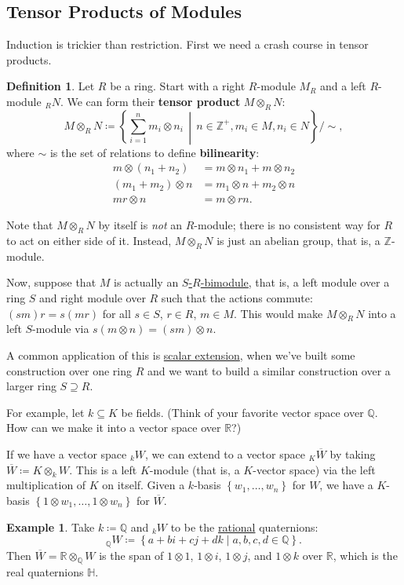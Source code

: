 \documentclass[12pt]{article}
\newcommand{\z}{\mathbb{Z}}
\newcommand{\q}{\mathbb{Q}}
\newcommand{\real}{\mathbb{R}}
\newcommand{\h}{\mathbb{H}}
\newcommand{\ita}[1]{\textit{#1}}
\newcommand\setb[1]{\left \{ #1 \right \}}
\theoremstyle{definition}
\newtheorem{definition}[theorem]{Definition}
\newtheorem{example}{Example}[section]
\begin{document}
\subsection{Tensor Products of Modules}
Induction is trickier than restriction. First we need a crash course in tensor products.
\begin{definition}
    Let $R$ be a ring. Start with a right $R$-module $M_R$ and a left $R$-module $_RN$. We can form their \textbf{tensor product} $M \otimes_R N$: 
    \begin{equation}
        M \otimes_R N \coloneqq  \left \{ \sum\limits_{i = 1}^n m_i \otimes n_i \, \middle| \, n \in \z^+ , m_i \in M , n_i \in N\right \} \bigg/ \sim,
    \end{equation}
    where $\sim$ is the set of relations to define \textbf{bilinearity}:
    \begin{equation}
        \begin{split}
            m \otimes (n_1 + n_2) & = m \otimes n_1 + m \otimes n_2 \\
            (m_1 + m_2) \otimes n & = m_1 \otimes n + m_2 \otimes n \\
            m r \otimes n & = m \otimes rn.
        \end{split}
    \end{equation}
\end{definition}
Note that $M \otimes_R N$ by itself is \ita{not} an $R$-module; there is no consistent way for $R$ to act on either side of it. Instead, $M \otimes_R N$ is just an abelian group, that is, a $\z$-module. 

Now, suppose that $M$ is actually an \underline{$S$-$R$-bimodule}, that is, a left module over a ring $S$ and right module over $R$ such that the actions commute: $(sm)r = s(mr)$ for all $s \in S$, $r \in R$, $m \in M$. This would make $M \otimes_R N$ into a left $S$-module via $s ( m \otimes n ) = (sm) \otimes n$.

A common application of this is \underline{scalar extension}, when we've built some construction over one ring $R$ and we want to build a similar construction over a larger ring $S \supseteq R$.

For example, let $k \subseteq K$ be fields. (Think of your favorite vector space over $\q$. How can we make it into a vector space over $\real$?)

If we have a vector space $_kW$, we can extend to a vector space $_K \overline{W}$ by taking $\overline{W} \coloneqq  K \otimes_k W$. This is a left $K$-module (that is, a $K$-vector space) via the left multiplication of $K$ on itself. Given a $k$-basis $\setb{w_1 , \dotsc , w_n}$ for $W$, we have a $K$-basis $\setb{ 1 \otimes w_1 , \dotsc , 1 \otimes w_n }$ for $\overline{W}$.
\begin{example}
    Take $k \coloneqq  \q$ and $_kW$ to be the \underline{rational} quaternions:
    \begin{equation}
        _{\q} W \coloneqq  \setb{ a + bi + cj + dk \mid a , b , c , d \in \q }.
    \end{equation}
    Then $\overline{W} = \real \otimes_{\q} W$ is the span of $1 \otimes 1$, $1 \otimes i$, $1 \otimes j$, and $1 \otimes k$ over $\real$, which is the real quaternions $\h$.
\end{example}
\end{document}
